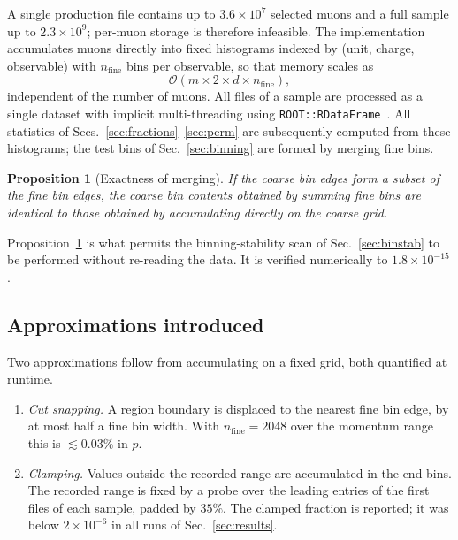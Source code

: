 \documentclass[11pt,a4paper]{article}
\theoremstyle{definition}
\theoremstyle{plain}
\newtheorem{proposition}{Proposition}[section]
\theoremstyle{remark}
\begin{document}
A single production file contains up to $3.6\times10^{7}$ selected muons and a
full sample up to $2.3\times10^{9}$; per-muon storage is therefore infeasible.
The implementation accumulates muons directly into fixed histograms indexed by
(unit, charge, observable) with $n_{\mathrm{fine}}$ bins per observable, so that
memory scales as
\begin{equation}
  \mathcal{O}\!\left(m \times 2 \times d \times n_{\mathrm{fine}}\right),
\end{equation}
independent of the number of muons. All files of a sample are processed as a
single dataset with implicit multi-threading using
\texttt{ROOT::RDataFrame}~\cite{ROOT,RDataFrame}. All statistics of
Secs.~\ref{sec:fractions}--\ref{sec:perm} are subsequently computed from these
histograms; the test bins of Sec.~\ref{sec:binning} are formed by merging fine
bins.

\begin{proposition}[Exactness of merging]
\label{prop:merge}
If the coarse bin edges form a subset of the fine bin edges, the coarse bin
contents obtained by summing fine bins are identical to those obtained by
accumulating directly on the coarse grid.
\end{proposition}

Proposition~\ref{prop:merge} is what permits the binning-stability scan of
Sec.~\ref{sec:binstab} to be performed without re-reading the data. It is
verified numerically to $1.8\times10^{-15}$.

\subsection{Approximations introduced}

Two approximations follow from accumulating on a fixed grid, both quantified at
runtime.

\begin{enumerate}
\item \emph{Cut snapping.} A region boundary is displaced to the nearest fine
bin edge, by at most half a fine bin width. With $n_{\mathrm{fine}} = 2048$ over
the momentum range this is $\lesssim 0.03\%$ in $p$.
\item \emph{Clamping.} Values outside the recorded range are accumulated in the
end bins. The recorded range is fixed by a probe over the leading entries of the
first files of each sample, padded by $35\%$. The clamped fraction is reported;
it was below $2\times10^{-6}$ in all runs of Sec.~\ref{sec:results}.
\end{enumerate}
\end{document}
